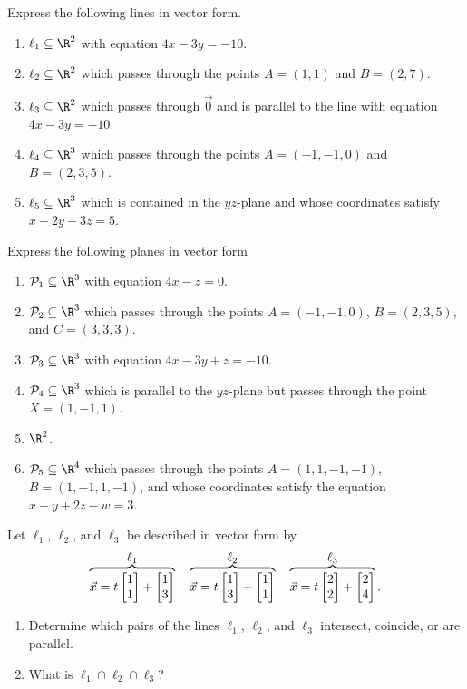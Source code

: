 \begin{exercises}
	\begin{problist}
		\prob  Express the following lines in vector form.
		\begin{enumerate}
			\item   $\ell_1\subseteq\R^2$ with equation $4x-3y=-10$.
			\item   $\ell_2\subseteq\R^2$ which passes through the points $A=(1,1)$ and $B=(2,7)$.
			\item   $\ell_3\subseteq\R^2$ which passes through $\vec 0$ and is parallel to the line
				with equation $4x-3y=-10$.
			\item   $\ell_4\subseteq\R^3$ which passes through the points $A=(-1,-1,0)$ and $B=(2,3,5)$.
			\item   $\ell_5\subseteq\R^3$ which is contained in the $yz$-plane and
				whose coordinates satisfy $x+2y-3z=5$.
		\end{enumerate}
		\prob Express the following planes in vector form
		\begin{enumerate}
			\item   $\mathcal P_1\subseteq\R^3$ with equation $4x-z=0$.
			\item   $\mathcal P_2\subseteq\R^3$ which passes through the points $A=(-1,-1,0)$, $B=(2,3,5)$, and $C=(3,3,3)$.
			\item   $\mathcal P_3\subseteq\R^3$ with equation $4x-3y+z=-10$.
			\item   $\mathcal P_4\subseteq\R^3$ which is parallel to the $yz$-plane but passes through the point $X=(1,-1,1)$.
			\item   $\R^2$.
			\item   $\mathcal P_5\subseteq\R^4$ which passes through the points $A=(1,1,-1,-1)$, $B=(1,-1,1,-1)$,
				and whose coordinates satisfy the equation $x+y+2z-w=3$.
		\end{enumerate}
		\prob Let $\ell_1$, $\ell_2$, and $\ell_3$ be described in vector form by
		\[
			\overbrace{\vec x=t\mat{1\\1}+\mat{1\\3}}^{\displaystyle \ell_1}
			\quad
			\overbrace{\vec x=t\mat{1\\3}+\mat{1\\1}}^{\displaystyle \ell_2}
			\quad
			\overbrace{\vec x=t\mat{2\\2}+\mat{2\\4}}^{\displaystyle \ell_3}.
		\]
		\begin{enumerate}
			\item
				Determine which pairs of the lines $\ell_1$, $\ell_2$, and $\ell_3$ intersect, 
				coincide, or are parallel.
			\item What is $\ell_1\cap\ell_2\cap\ell_3$?
		\end{enumerate}


\end{problist}
\end{exercises}
